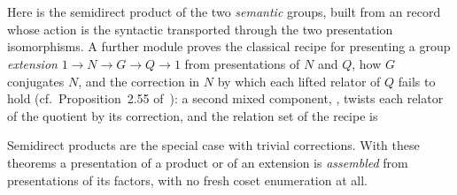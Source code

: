 \endgroup
\begin{code}[hide]%
%
\>[4]\AgdaSpace{}%
\AgdaSymbol{=}\AgdaSpace{}%
\<%
\\
%
\\[\AgdaEmptyExtraSkip]%
\>[0]\AgdaSpace{}%
\AgdaSymbol{:}\AgdaSpace{}%
\AgdaSpace{}%
\AgdaSpace{}%
\AgdaSpace{}%
\AgdaSpace{}%
\AgdaSpace{}%
\AgdaSpace{}%
\AgdaSpace{}%
\AgdaSpace{}%
\<%
\end{code}

\noindent Here  is the semidirect product of the two
\emph{semantic} groups, built from an  record whose action
is the syntactic  transported through the two presentation
isomorphisms.  A further module proves the classical recipe for
presenting a group \emph{extension} $1 \to N \to G \to Q \to 1$ from
presentations of $N$ and $Q$, how $G$ conjugates $N$, and the
correction in $N$ by which each lifted relator of $Q$ fails to hold
(cf.\ Proposition~2.55 of~\cite{holt2005handbook}): a second mixed
component, , twists each relator of the quotient by its
correction, and the relation set of the recipe is
\begingroup\renewcommand{\AgdaCodeStyle}{\footnotesize}
\begin{code}%
\>[0]\AgdaSpace{}%
\AgdaSpace{}%
\AgdaSpace{}%
\AgdaSpace{}%
\AgdaSpace{}%
\AgdaSymbol{=}\AgdaSpace{}%
\AgdaSpace{}%
\AgdaSpace{}%
\AgdaSpace{}%
\AgdaSpace{}%
\AgdaSymbol{(}\AgdaSpace{}%
\AgdaSpace{}%
\AgdaSpace{}%
\AgdaSpace{}%
\AgdaSpace{}%
\AgdaSymbol{)}\<%
\end{code}
\endgroup
Semidirect products are the special case with trivial corrections.
With these theorems a presentation of a product or of an extension is
\emph{assembled} from presentations of its factors, with no fresh coset
enumeration at all.
